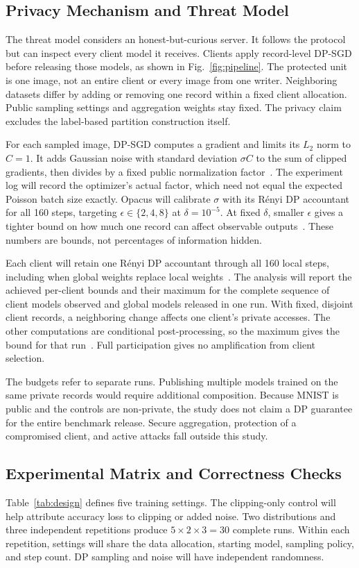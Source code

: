 \documentclass[nolineno]{ieeeaccess}
\begin{document}
\subsection{Privacy Mechanism and Threat Model}
The threat model considers an honest-but-curious server. It follows the protocol but can inspect every client model it receives. Clients apply record-level DP-SGD before releasing those models, as shown in Fig.~\ref{fig:pipeline}. The protected unit is one image, not an entire client or every image from one writer. Neighboring datasets differ by adding or removing one record within a fixed client allocation. Public sampling settings and aggregation weights stay fixed. The privacy claim excludes the label-based partition construction itself.

For each sampled image, DP-SGD computes a gradient and limits its $L_2$ norm to $C=1$. It adds Gaussian noise with standard deviation $\sigma C$ to the sum of clipped gradients, then divides by a fixed public normalization factor~\cite{abadi}. The experiment log will record the optimizer's actual factor, which need not equal the expected Poisson batch size exactly. Opacus will calibrate $\sigma$ with its R\'enyi DP accountant for all 160 steps, targeting $\epsilon\in\{2,4,8\}$ at $\delta=10^{-5}$. At fixed $\delta$, smaller $\epsilon$ gives a tighter bound on how much one record can affect observable outputs~\cite{dwork}. These numbers are bounds, not percentages of information hidden.

Each client will retain one R\'enyi DP accountant through all 160 local steps, including when global weights replace local weights~\cite{mironov}. The analysis will report the achieved per-client bounds and their maximum for the complete sequence of client models observed and global models released in one run. With fixed, disjoint client records, a neighboring change affects one client's private accesses. The other computations are conditional post-processing, so the maximum gives the bound for that run~\cite{dwork}. Full participation gives no amplification from client selection.

The budgets refer to separate runs. Publishing multiple models trained on the same private records would require additional composition. Because MNIST is public and the controls are non-private, the study does not claim a DP guarantee for the entire benchmark release. Secure aggregation, protection of a compromised client, and active attacks fall outside this study.

\subsection{Experimental Matrix and Correctness Checks}
Table~\ref{tab:design} defines five training settings. The clipping-only control will help attribute accuracy loss to clipping or added noise. Two distributions and three independent repetitions produce $5\times2\times3=30$ complete runs. Within each repetition, settings will share the data allocation, starting model, sampling policy, and step count. DP sampling and noise will have independent randomness.
\end{document}
